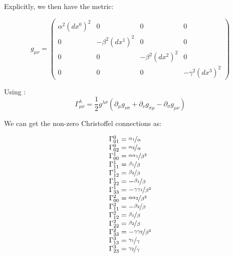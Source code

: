 \documentclass{article}
\begin{document}
Explicitly, we then have the metric:

\begin{equation}
g_{\mu\nu}=\left(\begin{array}{cccc}
\alpha^{2}\left(dx^{0}\right)^{2} & 0 & 0 & 0\\
0 & -\beta^{2}\left(dx^{1}\right)^{2} & 0 & 0\\
0 & 0 & -\beta^{2}\left(dx^{2}\right)^{2} & 0\\
0 & 0 & 0 & -\gamma^{2}\left(dx^{3}\right)^{2}
\end{array}\right)\label{eq:general-axisymmetric-static-matrix-metric}
\end{equation}

Using \cite{carroll2003spacetime}: 
\begin{equation}
\Gamma_{\mu\nu}^{\lambda}=\frac{1}{2}g^{\lambda\sigma}\left(\partial_{\mu}g_{\nu\sigma}+\partial_{\nu}g_{\sigma\mu}-\partial_{\sigma}g_{\mu\nu}\right)
\end{equation}

We can get the non-zero Christoffel connections as:
\begin{center}
\begin{equation}
\begin{array}{l}
\Gamma_{01}^{0}=\nicefrac{\alpha_{1}}{\alpha}\\
\Gamma_{02}^{0}=\nicefrac{\alpha_{2}}{\alpha}\\
\Gamma_{00}^{1}=\nicefrac{\alpha \alpha_{1}}{\beta^{2}}\\
\Gamma_{11}^{1}=\nicefrac{\beta_{1}}{\beta}\\
\Gamma_{12}^{1}=\nicefrac{\beta_{2}}{\beta}\\
\Gamma_{22}^{1}=-\nicefrac{\beta_{1}}{\beta}\\
\Gamma_{33}^{1}=-\nicefrac{\gamma\gamma_{1}}{\beta^{2}}\\
\Gamma_{00}^{2}=\nicefrac{\alpha\alpha_{2}}{\beta^{2}}\\
\Gamma_{11}^{2}=-\nicefrac{\beta_{2}}{\beta}\\
\Gamma_{12}^{2}=\nicefrac{\beta_{1}}{\beta}\\ 
\Gamma_{22}^{2}=\nicefrac{\beta_{2}}{\beta}\\
\Gamma_{33}^{2}=-\nicefrac{\gamma\gamma_{2}}{\beta^{2}}\\
\Gamma_{13}^{3}=\nicefrac{\gamma_{1}}{\gamma}\\
\Gamma_{23}^{3}=\nicefrac{\gamma_{2}}{\gamma}\\
\end{array}
\end{equation}
\end{center}
\end{document}
